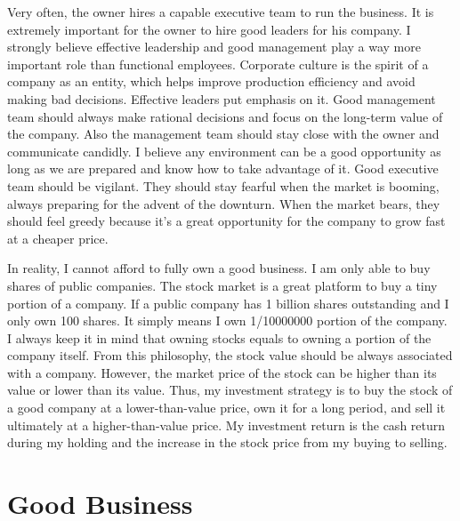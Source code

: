 \documentclass[11pt]{article}
\begin{document}
Very often, the owner hires a capable executive team to run the business. It is extremely important for the owner to hire good leaders for his company. I strongly believe effective leadership and good management play a way more important role than functional employees. Corporate culture is the spirit of a company as an entity, which helps improve production efficiency and avoid making bad decisions. Effective leaders put emphasis on it. Good management team should always make rational decisions and focus on the long-term value of the company. Also the management team should stay close with the owner and communicate candidly. I believe any environment can be a good opportunity as long as we are prepared and know how to take advantage of it. Good executive team should be vigilant. They should stay fearful when the market is booming, always preparing for the advent of the downturn. When the market bears, they should feel greedy because it’s a great opportunity for the company to grow fast at a cheaper price.

In reality, I cannot afford to fully own a good business. I am only able to buy shares of public companies. The stock market is a great platform to buy a tiny portion of a company. If a public company has 1 billion shares outstanding and I only own 100 shares. It simply means I own 1/10000000 portion of the company. I always keep it in mind that owning stocks equals to owning a portion of the company itself. From this philosophy, the stock value should be always associated with a company. However, the market price of the stock can be higher than its value or lower than its value. Thus, my investment strategy is to buy the stock of a good company at a lower-than-value price, own it for a long period, and sell it ultimately at a higher-than-value price. My investment return is the cash return during my holding and the increase in the stock price from my buying to selling.            
 
\section{Good Business}
\end{document}
